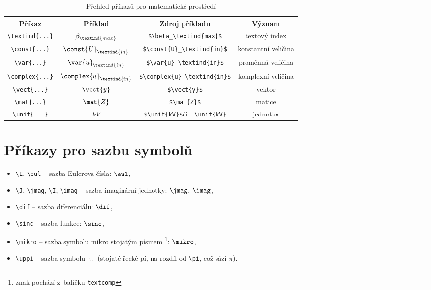 \begin{table}[!h]
  \caption[Přehled příkazů]{Přehled příkazů pro matematické prostředí }
  \begin{center}
  	\small
	  \begin{tabular}{|c|c|c|c|}
	    \hline
	    Příkaz    						& Příklad 					& Zdroj příkladu  							& Význam  \\
	    \hline\hline
	    \verb|\textind{...}|	& $\beta_\textind{max}$ 	& \verb|$\beta_\textind{max}$|	& textový index \\
	    \hline
	    \verb|\const{...}| 		& $\const{U}_\textind{in}$ 				& \verb|$\const{U}_\textind{in}$|		& konstantní veličina \\
	    \hline
	    \verb|\var{...}| 		& $\var{u}_\textind{in}$ & \verb|$\var{u}_\textind{in}$| & proměnná veličina \\
	    \hline
	    \verb|\complex{...}| 	& $\complex{u}_\textind{in}$ & \verb|$\complex{u}_\textind{in}$| & komplexní veličina \\
	    \hline
	    \verb|\vect{...}| 		& $\vect{y}$ 						& \verb|$\vect{y}$| & vektor \\
	    \hline
	    \verb|\mat{...}| 	& $\mat{Z}$ 						& \verb|$\mat{Z}$| & matice \\
	    \hline
	    \verb|\unit{...}| 		& $\unit{kV}$ 						& \verb|$\unit{kV}$|\quad či\ \, \verb|\unit{kV}| & jednotka \\
	    \hline
	  \end{tabular}
  \end{center}
\end{table}



\newpage
\section{Příkazy pro sazbu symbolů}

\begin{itemize}
  \item
    \verb|\E|, \verb|\eul| -- sazba Eulerova čísla: $\eul$,
  \item
    \verb|\J|, \verb|\jmag|, \verb|\I|, \verb|\imag| -- sazba imaginární jednotky: $\jmag$, $\imag$,
  \item
    \verb|\dif| -- sazba diferenciálu: $\dif$,
  \item
    \verb|\sinc| -- sazba funkce: $\sinc$,
  \item
    \verb|\mikro| -- sazba symbolu mikro stojatým písmem%
			\footnote{znak pochází z~balíčku \texttt{textcomp}}: $\mikro$,
	\item
		\verb|\uppi| -- sazba symbolu $\uppi$
			(stojaté řecké pí, na rozdíl od \verb|\pi|, což sází $\pi$).
\end{itemize}

